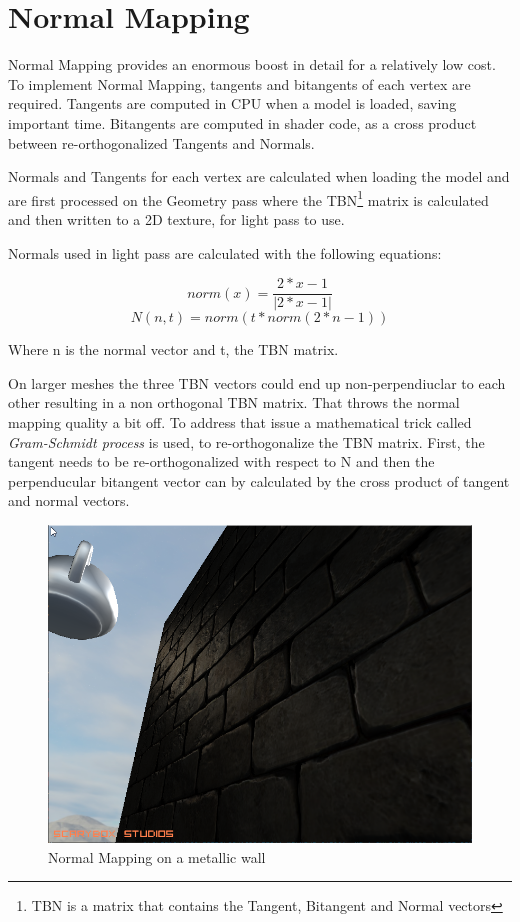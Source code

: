 \section{Normal Mapping}
Normal Mapping provides an enormous boost in detail for a relatively low cost. To implement
Normal Mapping, tangents and bitangents of each vertex are required. Tangents are computed in CPU
when a model is loaded, saving important time. Bitangents are computed in shader code, as a cross
product between re-orthogonalized Tangents and Normals.

Normals and Tangents for each vertex are calculated when loading the model and are first processed
on the Geometry pass where the TBN\footnote{TBN is a matrix that contains the Tangent, Bitangent
and Normal vectors} matrix is calculated and then written to a 2D texture, for light pass to use.

\noindent Normals used in light pass are calculated with the following equations:

$$norm(x)=\frac{2*x - 1}{\vert 2*x - 1 \vert}$$
$$N(n, t)=norm(t*norm(2*n - 1))$$

\noindent Where n is the normal vector and t, the TBN matrix.

On larger meshes the three TBN vectors could end up non-perpendiuclar to each other resulting in
a non orthogonal TBN matrix. That throws the normal mapping quality a bit off. To address that
issue a mathematical trick called \textit{Gram-Schmidt process} is used, to re-orthogonalize
the TBN matrix. First, the tangent needs to be re-orthogonalized with respect to N and then
the perpenducular bitangent vector can by calculated by the cross product of tangent and normal
vectors.

\begin{figure}[h]
    \centering
    \includegraphics[scale=0.4,clip=true]{./image/nm1.png}
    \caption{Normal Mapping on a metallic wall}
\end{figure}

